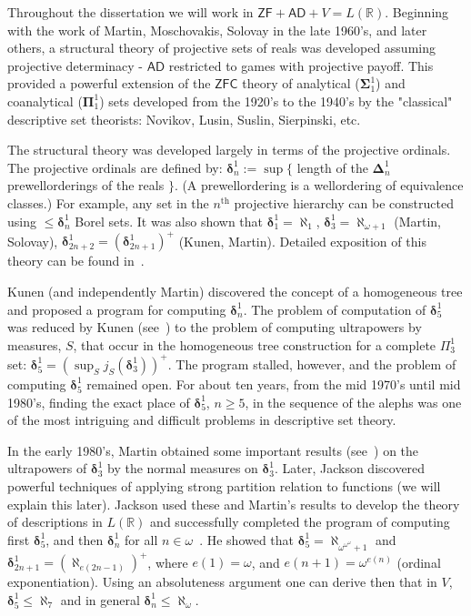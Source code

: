 \documentclass[bibother]{asl}
\theoremstyle{definition}
\theoremstyle{remark}
\newcommand{\ad}{\textsf{AD}}
\newcommand{\zf}{\textsf{ZF}}
\newcommand{\zfc}{\textsf{ZFC}}
\newcommand{\bd}{\boldsymbol{\delta}}
\newcommand{\bD}{\boldsymbol{\Delta}}
\newcommand{\bP}{\boldsymbol{\Pi}}
\newcommand{\bS}{\boldsymbol{\Sigma}}
\newcommand{\om}{\omega}
\newcommand{\LR}{{L(\mathbb{R})}}
\newcommand{\al}[1]{{\aleph_{#1}}}
\newcommand{\rc}[2]{{\color{red}#2}\marginnote{{\color{red}#1}}}
\begin{document}
Throughout the dissertation we will work in $\zf+\ad+V = \LR$. 
Beginning with the work of Martin, Moschovakis, Solovay in the late 1960's, and later others, a structural theory of
projective sets of reals was developed assuming projective determinacy - $\ad$ restricted to games with projective payoff.
This provided a powerful extension of the $\zfc$ theory of analytical ($\bS^1_1$) and coanalytical ($\bP^1_1$) sets
developed from the 1920's to the 1940's by the "classical" descriptive set theorists: Novikov, Lusin, Suslin, Sierpinski, etc.

The structural theory was developed largely in terms of the projective ordinals.
The projective ordinals are defined by: $\bd^1_n:=\sup\{$ length of the $\bD^1_n$ prewellorderings of the reals $\}$.
(A prewellordering is a wellordering of equivalence classes.)
For example, any set in the $n^{\textrm{th}}$ projective hierarchy can be constructed using $\le \bd^1_n$ Borel sets.
It was also shown that $\bd^1_1=\al{1}$, $\bd^1_3=\al{\om+1}$ (Martin, Solovay), $\bd^1_{2n+2}=(\bd^1_{2n+1})^+$ (Kunen, Martin).
Detailed exposition of this theory can be found in~\cite{Mo, Ke, Ke1, Ke2}.

Kunen (and independently Martin) discovered the concept of a homogeneous tree and proposed a program for computing $\bd^1_n$.
The problem of computation of $\bd^1_5$ was reduced by Kunen (see~\cite{Ke2}) to the problem of computing ultrapowers by measures, $S$,
that occur in the homogeneous tree construction for a complete $\Pi^1_3$ set: $\bd^1_5=(\sup_S j_S(\bd^1_3))^+$.
The program stalled, however, and the problem of computing $\bd^1_5$ remained open.
For about ten years, from the mid 1970's until mid 1980's, finding the exact place of $\bd^1_5$, $n\ge 5$, in the
sequence of the alephs was one of the most intriguing and difficult problems in descriptive set theory.

In the early 1980's, Martin obtained some important results (see~\cite{J1}) on the ultrapowers of $\bd^1_3$ by 
\rc{!}{the normal measures on $\bd^1_3$}.
Later, Jackson discovered powerful techniques of applying strong partition relation to functions (we will explain this later).
Jackson used these and Martin's results to develop the theory of descriptions in $\LR$ and successfully completed the program of computing 
first $\bd^1_5$, and then $\bd^1_n$ for all $n\in\om$~\cite{J2}.  
He showed that $\bd^1_5=\al{\om^{\om^\om}+1}$ and $\bd^1_{2n+1}=(\al{e(2n-1)})^+$, where $e(1)=\om$, and $e(n+1)=\om^{e(n)}$ (ordinal exponentiation).
Using an absoluteness argument one can derive then that in $V$, $\bd^1_5\le \al{7}$ and in general $\bd^1_n\le \al{\om}$.
\end{document}
